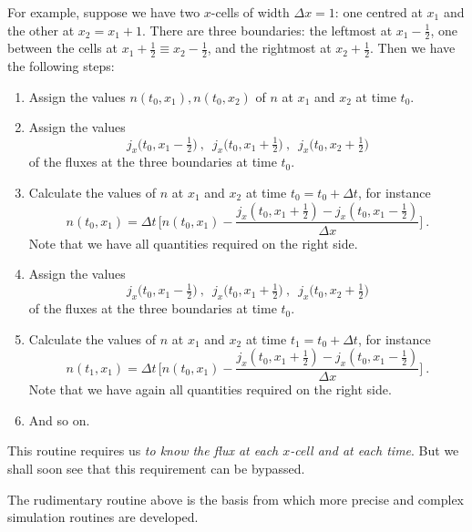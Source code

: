 \documentclass[a4paper,12pt,%
onecolumn,oneside,titlepage,%
british%
]{memoir}
\newcommand*{\incr}{\Delta}%
\renewcommand*{\|}[1][]{\nonscript\:#1\vert\nonscript\:\mathopen{}}
\newcommand*{\yti}{t_{0}}
\newcommand*{\ytf}{t_{1}}
\newcommand*{\Dt}{\incr t}
\newcommand*{\Dx}{\incr x}
\begin{document}
For example, suppose we have two $x$-cells of width $\Dx=1$: one centred at $x_{1}$ and the other at $x_{2} = x_{1}+1$. There are three boundaries: the leftmost at $x_{1}-\tfrac12$, one between the cells at $x_{1}+\tfrac12 \equiv x_{2}-\tfrac12$, and the rightmost at $x_{2}+\tfrac12$. Then we have the following steps:

{\small

\begin{enumerate}[label=\arabic*.]
\item Assign the values $n(\yti,x_{1}), n(\yti,x_{2})$ of $n$ at $x_{1}$ and $x_{2}$ at time $\yti$.

\item Assign the values $$j_{x}\bigl(\yti,x_{1}-\tfrac12\bigr)\ , \enspace j_{x}\bigl(\yti,x_{1}+\tfrac12\bigr)\ , \enspace j_{x}\bigl(\yti,x_{2}+\tfrac12\bigr)$$
  of the fluxes at the three boundaries at time $\yti$.

\item Calculate the values of $n$ at $x_{1}$ and $x_{2}$ at time $\yti=\yti+\Dt$, for instance
  $$ n(\yti,x_{1}) =
  \Dt\,\biggl[ n(\yti,x_{1}) - \frac{j_{x}(\yti, x_{1}+\tfrac12)-j_{x}(\yti,x_{1}-\tfrac12)}{\Dx} \biggr] \ .$$
  Note that we have all quantities required on the right side.

\item Assign the values $$j_{x}\bigl(\yti,x_{1}-\tfrac12\bigr)\ , \enspace j_{x}\bigl(\yti,x_{1}+\tfrac12\bigr)\ , \enspace j_{x}\bigl(\yti,x_{2}+\tfrac12\bigr)$$
  of the fluxes at the three boundaries at time $\yti$.

\item Calculate the values of $n$ at $x_{1}$ and $x_{2}$ at time $\ytf=\yti+\Dt$, for instance
  $$ n(\ytf,x_{1}) =
  \Dt\,\biggl[ n(\yti,x_{1}) - \frac{j_{x}(\yti, x_{1}+\tfrac12)-j_{x}(\yti,x_{1}-\tfrac12)}{\Dx} \biggr] \ .$$
  Note that we have again all quantities required on the right side.

\item And so on.
\end{enumerate}

}

This routine requires us \emph{to know the flux at each $x$-cell and at each time}. But we shall soon see that this requirement can be bypassed.

The rudimentary routine above is the basis from which more precise and complex simulation routines are developed.
\end{document}
